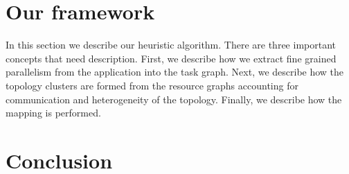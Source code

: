 \documentclass[10pt, conference, compsocconf]{IEEEtran}
\begin{document}

\section{Our framework}
\label{sec:our-framework}

In this section we describe our heuristic algorithm. There are three
important concepts that need description. First, we describe how we
extract fine grained parallelism from the application into the task
graph. Next, we describe how the topology clusters are formed from the
resource graphs accounting for communication and heterogeneity of the
topology. Finally, we describe how the mapping is performed.











\section{Conclusion}
\label{sec:conclusion}
\end{document}

